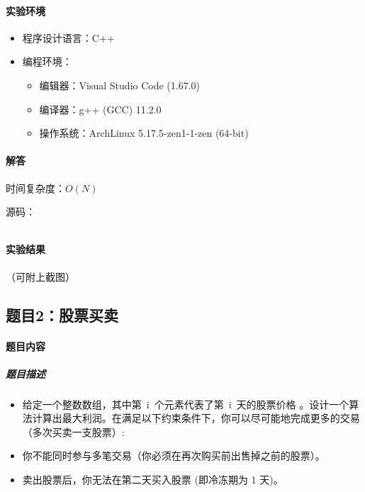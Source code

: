 \documentclass[12pt,a4paper]{ctexart}
\begin{document}
\vspace{5pt}

\paragraph{实验环境}
\begin{itemize}
    \item 程序设计语言：C++
    \item 编程环境：
    \begin{itemize}
        \item 编辑器：Visual Studio Code (1.67.0)
        \item 编译器：g++ (GCC) 11.2.0
        \item 操作系统：ArchLinux 5.17.5-zen1-1-zen (64-bit)
    \end{itemize}
\end{itemize}

\vspace{5pt}

\paragraph{解答} 时间复杂度：$O(N)$

源码：
\inputminted[bgcolor=codebg,frame=lines,autogobble,linenos=true,breaklines]{cpp}{src/t1.cpp}

\vspace{5pt}

\paragraph{实验结果}
（可附上截图）

\newpage


\subsection*{题目2：股票买卖}
\paragraph{题目内容}
\subparagraph{题目描述}
\begin{itemize}
    \item 给定一个整数数组，其中第 i 个元素代表了第 i 天的股票价格 。设计一个算法计算出最大利润。在满足以下约束条件下，你可以尽可能地完成更多的交易（多次买卖一支股票）:
    \item 你不能同时参与多笔交易（你必须在再次购买前出售掉之前的股票）。
    \item 卖出股票后，你无法在第二天买入股票 (即冷冻期为 1 天)。
\end{itemize}
\end{document}
